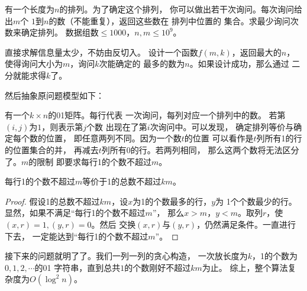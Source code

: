 \begin{prob}
	有一个长度为$n$的排列。为了确定这个排列，
	你可以做出若干次询问。每次询问给出$m$个
	$1$到$n$的数（不能重复），返回这些数在
	排列中位置的
	集合。求最少询问次数来确定排列。
	数据组数$\le 1000$，$n,m \le 10^9$。
\end{prob}

\begin{sol}
	直接求解信息量太少，不妨由反切入。
	设计一个函数$f(m,k)$，返回最大的$n$，
	使得询问大小为$m$，询问$k$次能确定的
	最多的数为$n$。如果设计成功，那么通过
	二分就能求得$k$了。
	\par 然后抽象原问题模型如下：
	\par
	有一个$k \times n$的01矩阵。每行代表
	一次询问，每列对应一个排列中的数。
	若第$(i,j)$为$1$，则表示第$j$个数
	出现在了第$i$次询问中。可以发现，
	确定排列等价与确定每个数的位置，
	即任意两列不同。因为一个数$t$的位置
	可以看作是$t$列所有1的行的位置集合的并，
	再减去$t$列所有0的行。若两列相同，
	那么这两个数将无法区分了。$m$的限制
	即要求每行1的个数不超过$m$。
	\begin{theorem}[弱化限制] 每行1的个数不超过$m$等价于1的总数不超过$km$。
	\end{theorem}
	\begin{proof}
		假设1的总数不超过$km$，设$x$为1的个数最多的行，$y$为
		1个个数最少的行。显然，如果不满足“每行1的个数不超过$m$”，
		那么$x > m$，$y < m$。取列$r$，使$(x,r)=1,(y,r)=0$。然后
		交换$(x,r)$与$(y,r)$，仍然满足条件。一直进行下去，
		一定能达到“每行1的个数不超过$m$”。
	\end{proof}
	\par
	接下来的问题就明了了。我们一列一列的贪心构造，
	一次放长度为$k$，1的个数为$0,1,2,\cdots$的01
	字符串，直到总共$1$的个数刚好不超过$km$为止。
	综上，整个算法复杂度为$O(\log^2 n)$。

\end{sol}

